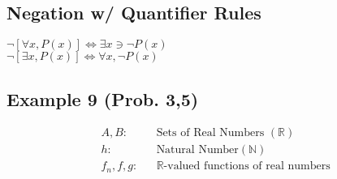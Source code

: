 \documentclass{article}
\begin{document}
\subsection{Negation w/ Quantifier Rules}
$\neg [ \forall x, P(x) ] \iff \exists x \ni \neg P(x)$\\
$\neg [ \exists x, P(x) ] \iff \forall x, \neg P(x)$

\subsection{Example 9 (Prob. 3,5)}
\begin{align*}
	& A, B: && \text{Sets of Real Numbers } (\mathbb{R}) \\
	& h: && \text{Natural Number} (\mathbb{N}) \\
	& f_n, f, g: && \mathbb{R} \text{-valued functions of real numbers}\\
\end{align*}
\end{document}
